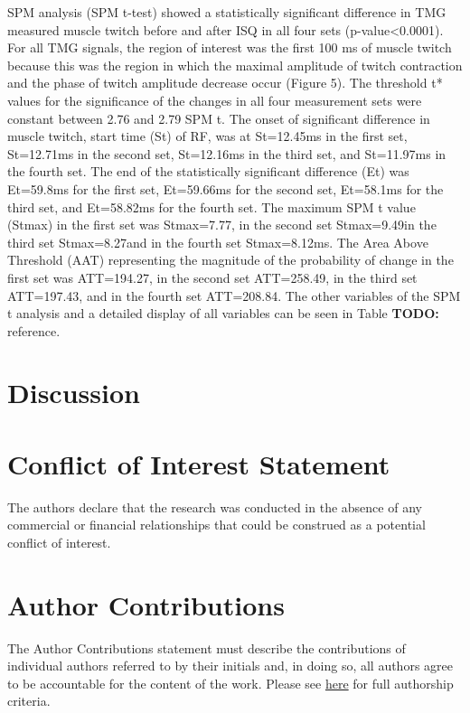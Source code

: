 \documentclass[utf8]{style/FrontiersinHarvard}
\newcommand{\TODO}[1]{{\textbf{TODO:} {\color{red} #1}}}
\begin{document}

SPM analysis (SPM t-test) showed a statistically significant difference in TMG measured muscle twitch before and after ISQ in all four sets (p-value<0.0001).
For all TMG signals, the region of interest was the first 100 ms of muscle twitch because this was the region in which the maximal amplitude of twitch contraction and the phase of twitch amplitude decrease occur (Figure 5).
The threshold t* values for the significance of the changes in all four measurement sets were constant between 2.76 and 2.79 SPM t.
The onset of significant difference in muscle twitch, start time (St) of RF, was at St=12.45ms in the first set, St=12.71ms in the second set, St=12.16ms in the third set, and St=11.97ms in the fourth set.
The end of the statistically significant difference (Et) was Et=59.8ms for the first set, Et=59.66ms for the second set, Et=58.1ms for the third set, and Et=58.82ms for the fourth set.
The maximum SPM t value (Stmax) in the first set was Stmax=7.77, in the second set Stmax=9.49in the third set Stmax=8.27and in the fourth set Stmax=8.12ms.
The Area Above Threshold (AAT) representing the magnitude of the probability of change in the first set was ATT=194.27, in the second set ATT=258.49, in the third set ATT=197.43, and in the fourth set ATT=208.84.
The other variables of the SPM t analysis and a detailed display of all variables can be seen in Table \TODO{reference}.


\section{Discussion}

\section*{Conflict of Interest Statement}
The authors declare that the research was conducted in the absence of any commercial or financial relationships that could be construed as a potential conflict of interest.

\section*{Author Contributions}
The Author Contributions statement must describe the contributions of individual authors referred to by their initials and, in doing so, all authors agree to be accountable for the content of the work.
Please see \href{https://www.frontiersin.org/about/policies-and-publication-ethics#AuthorshipAuthorResponsibilities}{here} for full authorship criteria.
\end{document}
